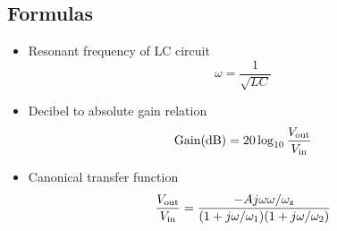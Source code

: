 \subsection*{Formulas}
\begin{itemize}
  \item Resonant frequency of LC circuit
  \begin{equation}
    \omega = \frac{1}{\sqrt{LC}}
    \label{eq:lc}
  \end{equation}
  \item Decibel to absolute gain relation
  \begin{equation}
    \text{Gain}\pa{\text{dB}} = 20\log_{10}\frac{\Vout}{\Vin}
    \label{eq:gaindb}
  \end{equation}
  \item Canonical transfer function
  \begin{equation}
    \frac{V_\text{out}}{V_\text{in}} = \frac{
      -A j\omega \omega / \omega_\text{z}
    }{
      (1 + j\omega/\omega_1)(1 + j\omega/\omega_2)
    }
    \label{eq:tfcanon}
  \end{equation}
\end{itemize}